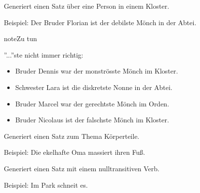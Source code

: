 \documentclass[a4paper,12pt,oneside]{sphinxmanual}
\begin{document}
\begin{fulllineitems}
\label{module:pyzufall.satz.satz_kloster}
Generiert einen Satz über eine Person in einem Kloster.

Beispiel: Der Bruder Florian ist der debilste Mönch in der Abtei.

\begin{notice}{note}{Zu tun}

''...''ste nicht immer richtig:
\begin{itemize}
\item {} 
Bruder Dennis war der monströsste Mönch im Kloster.

\item {} 
Schwester Lara ist die diskretste Nonne in der Abtei.

\item {} 
Bruder Marcel war der gerechtste Mönch im Orden.

\item {} 
Bruder Nicolaus ist der falschste Mönch im Kloster.

\end{itemize}
\end{notice}

\end{fulllineitems}


\begin{fulllineitems}
\label{module:pyzufall.satz.satz_koerperteil}
Generiert einen Satz zum Thema Körperteile.

Beispiel: Die ekelhafte Oma massiert ihren Fuß.

\end{fulllineitems}


\begin{fulllineitems}
\label{module:pyzufall.satz.satz_nulltransitiv}
Generiert einen Satz mit einem nulltransitiven Verb.

Beispiel: Im Park schneit es.

\end{fulllineitems}

\end{document}
